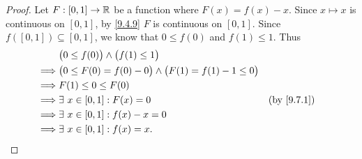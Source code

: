 \begin{proof}
  Let \(F : [0, 1] \to \mathbb{R}\) be a function where \(F(x) = f(x) - x\).
  Since \(x \mapsto x\) is continuous on \([0, 1]\), by \cref{9.4.9} \(F\) is continuous on \([0, 1]\).
  Since \(f([0, 1]) \subseteq [0, 1]\), we know that \(0 \leq f(0)\) and \(f(1) \leq 1\).
  Thus
  \begin{align*}
             & \big(0 \leq f(0)\big) \land \big(f(1) \leq 1\big)                                       \\
    \implies & \big(0 \leq F(0) = f(0) - 0\big) \land \big(F(1) = f(1) - 1 \leq 0\big)                 \\
    \implies & F(1) \leq 0 \leq F(0)                                                                   \\
    \implies & \exists\ x \in [0, 1] : F(x) = 0                                        &  & \by{9.7.1} \\
    \implies & \exists\ x \in [0, 1] : f(x) - x = 0                                                    \\
    \implies & \exists\ x \in [0, 1] : f(x) = x.
  \end{align*}
\end{proof}